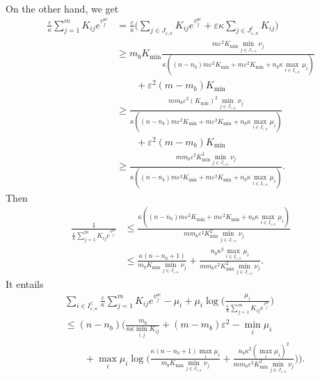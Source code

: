 On the other hand, we get
\begin{align*}
\frac \varepsilon\kappa\sum_{j=1}^m K_{ij} e^{v^{\text{sc}}_j}&=\frac \varepsilon\kappa \Big(\sum_{j\in J_{\varepsilon,\kappa}}K_{ij} e^{v^{\text{sc}}_j} + \varepsilon \kappa\sum_{j\in J^\complement_{\varepsilon,\kappa}}K_{ij}\Big)\\
&\geq m_bK_{\min} \frac{m\varepsilon^2K_{\min}\min_{j \in J_{\varepsilon,\kappa}}\nu_j}{\kappa((n-n_b)m\varepsilon^2K_{\min} + m\varepsilon^2K_{\min} + n_b\kappa\max_{i\in I_{\varepsilon,\kappa}}\mu_i)}\\
&\qquad +\varepsilon^2 (m- m_b) K_{\min}\\
&\geq \frac{mm_b\varepsilon^2(K_{\min})^2\min_{j \in J_{\varepsilon,\kappa}}\nu_j}{\kappa((n-n_b)m\varepsilon^2K_{\min}+ m\varepsilon^2K_{\min} + n_b\kappa\max_{i\in I_{\varepsilon,\kappa}}\mu_i)}\\
&\qquad +\varepsilon^2 (m- m_b) K_{\min}\\
&\geq \frac{mm_b\varepsilon^2K_{\min}^2\min_{j \in J_{\varepsilon,\kappa}}\nu_j}{\kappa((n-n_b)m\varepsilon^2K_{\min}+ m\varepsilon^2K_{\min} + n_b\kappa\max_{i\in I_{\varepsilon,\kappa}}\mu_i)}.
\end{align*}
Then 
\begin{align*}
\frac{1}{\frac \varepsilon\kappa\sum_{j=1}^m K_{ij} e^{v^{\text{sc}}_j}} &\leq \frac{\kappa((n-n_b)m\varepsilon^2K_{\min}+ m\varepsilon^2K_{\min} + n_b\kappa\max_{i\in I_{\varepsilon,\kappa}}\mu_i)}{mm_b\varepsilon^2 K_{\min}^2\min_{j \in J_{\varepsilon,\kappa}}\nu_j}\\
&\leq \frac{\kappa(n-n_b+ 1)}{m_bK_{\min}\min_{j \in J_{\varepsilon,\kappa}}\nu_j} + \frac{n_b\kappa^2\max_{i\in I_{\varepsilon,\kappa}}\mu_i}{mm_b\varepsilon^2K_{\min}^2\min_{j \in J_{\varepsilon,\kappa}}\nu_j}.
\end{align*}
It entails 
\begin{align*}
&\sum_{i\in I^\complement_{\varepsilon,\kappa}}\frac \varepsilon\kappa\sum_{j=1}^m K_{ij} e^{v^{\text{sc}}_j} - \mu_i + \mu_i \log\Big(\frac{\mu_i}{\frac \varepsilon\kappa\sum_{j=1}^m K_{ij} e^{v^{\text{sc}}_j}}\Big)\\
&\leq (n-n_b)\bigg(\frac{m_b}{n\kappa\min_{i,j} K_{ij}} + (m- m_b) \varepsilon^2 - \min_{i}\mu_i\\
&\qquad + \max_{i}\mu_i\log\Big(\frac{\kappa(n-n_b+ 1)\max_{i}\mu_i}{m_bK_{\min}\min_{j \in J_{\varepsilon,\kappa}}\nu_j} + \frac{n_b\kappa^2(\max_{i}\mu_i)^2}{mm_b\varepsilon^2 K_{\min}^2\min_{j \in J_{\varepsilon,\kappa}}\nu_j}\Big)
\bigg).
\end{align*}
